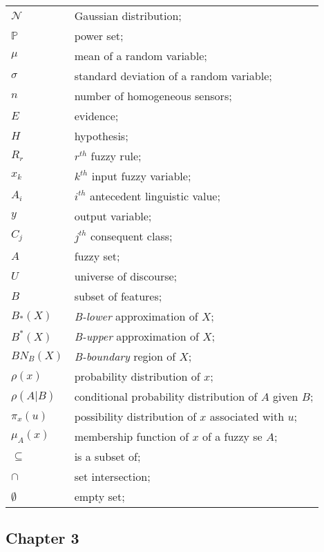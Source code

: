 \begin{longtable}{ll}
	$\mathcal{N}$			& Gaussian distribution; \\
	$\mathbb{P}$			& power set; \\
	
	$\mu$ 					& mean of a random variable; \\
	$\sigma$ 				& standard deviation of a random variable;\\
	
	$n$						& number of homogeneous sensors; \\
	$E$						& evidence; \\ 
	$H$						& hypothesis; \\
	$R_r$					& $r^{th}$ fuzzy rule; \\
	$x_k$					& $k^{th}$ input fuzzy variable; \\
	$A_i$					& $i^{th}$ antecedent linguistic value; \\
	$y$						& output variable; \\
	$C_j$					& $j^{th}$ consequent class; \\
	$A$						& fuzzy set; \\
	$U$						& universe of discourse; \\
	$B$						& subset of features; \\
	$B_*(X)$				& \textit{B-lower} approximation of $X$; \\
	$B^*(X)$				& \textit{B-upper} approximation of $X$; \\
	$BN_B(X)$				& \textit{B-boundary} region of $X$; \\
	
	$\rho(x)$				& probability distribution of $x$; \\
	$\rho(A|B)$				& conditional probability distribution of $A$ given $B$; \\
	$\pi_x(u)$				& possibility distribution of $x$ associated with $u$; \\
	$\mu_A(x)$				& membership function of $x$ of a fuzzy se $A$; \\
	
	
	$\subseteq$				& is a subset of; \\
	$\cap$					& set intersection; \\
	$\emptyset$				& empty set; \\
	
\end{longtable}


\subsection*{Chapter 3}

